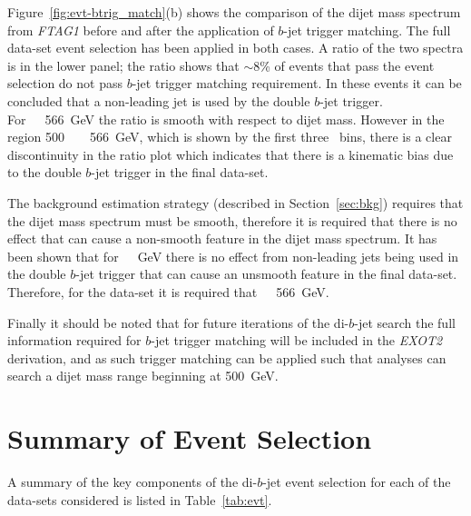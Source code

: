 Figure~\ref{fig:evt-btrig_match}(b) shows the comparison of the dijet mass spectrum from \textit{FTAG1}
before and after the application of $b$-jet trigger matching.
The full \lm{} data-set event selection has been applied in both cases.
A ratio of the two spectra is in the lower panel;
the ratio shows that $\sim$8\% of events that
pass the \lm{} event selection do not pass $b$-jet trigger matching requirement.
In these events it can be concluded that a non-leading jet is used by the double $b$-jet trigger.
For~\mjj~\gt~566~GeV the ratio is smooth with respect to dijet mass.
However in the region 500~\lt~\mjj~\lt~566~GeV, which is shown by the first three \mjj{}~bins,
there is a clear discontinuity in the ratio plot
which indicates that there is a kinematic bias due to the double $b$-jet trigger in the final data-set.

The background estimation strategy (described in Section~\ref{sec:bkg}) requires that the dijet mass spectrum must be smooth,
therefore it is required that there is no effect that can cause a non-smooth feature in the dijet mass spectrum.
It has been shown that for~\mjj~~GeV there is no effect from non-leading jets being used in the double $b$-jet trigger
that can cause an unsmooth feature in the final data-set.
Therefore, for the \lm{} data-set it is required that~\mjj~\gt~566~GeV.

Finally it should be noted that for future iterations of the di-$b$-jet search
the full information required for $b$-jet trigger matching will be included in the \textit{EXOT2} derivation,
and as such trigger matching can be applied such that analyses can search a dijet mass range beginning at 500~GeV.

\vfill

\section{Summary of Event Selection}
\label{sec:evt-sel-acc}

A summary of the  key components of the di-$b$-jet event selection
for each of the data-sets considered
is listed in Table~\ref{tab:evt}.

